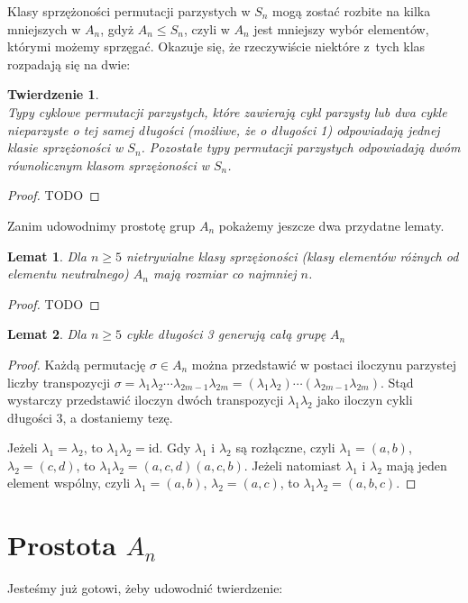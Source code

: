 \documentclass[licencjacka]{pracamgr}
\newtheorem{thh}{Twierdzenie}[section]
\newtheorem{lemma}{Lemat}[section]
\begin{document}
Klasy sprzężoności permutacji parzystych w $S_n$ mogą zostać rozbite na kilka mniejszych w $A_n$, 
gdyż $A_n \le S_n$, czyli w $A_n$ jest mniejszy wybór elementów, którymi możemy sprzęgać.
Okazuje się, że rzeczywiście niektóre z~tych klas rozpadają się na dwie:

\begin{thh}\label{thm_o_klasach_A_n} $ $ \\
	Typy cyklowe permutacji parzystych, które zawierają cykl parzysty lub dwa cykle nieparzyste o tej samej długości (możliwe, że o długości 1)
	odpowiadają jednej klasie sprzężoności w $S_n$.
	Pozostałe typy permutacji parzystych odpowiadają dwóm równolicznym klasom sprzężoności w $S_n$.
\end{thh}
\begin{proof}TODO
\end{proof}

Zanim udowodnimy prostotę grup $A_n$ pokażemy jeszcze dwa przydatne lematy.

\begin{lemma}\label{lemma_big_con}
	Dla $n \ge 5$ nietrywialne klasy sprzężoności (klasy elementów różnych od elementu neutralnego) $A_n$ mają rozmiar co najmniej $n$.
\end{lemma}
\begin{proof}TODO
\end{proof}

\begin{lemma}\label{lemma_3cycles}
	Dla $n \ge 5$ cykle długości 3 generują całą grupę $A_n$
\end{lemma}
\begin{proof}
	Każdą permutację  $\sigma \in A_n$ można przedstawić w postaci iloczynu parzystej liczby transpozycji
	$\sigma = \lambda_1 \lambda_2 \cdots \lambda_{2m-1} \lambda_{2m} = (\lambda_1 \lambda_2) \cdots (\lambda_{2m-1} \lambda_{2m})$.
	Stąd wystarczy przedstawić iloczyn dwóch transpozycji $\lambda_1 \lambda_2$ jako iloczyn cykli długości 3, a dostaniemy tezę.

	Jeżeli $\lambda_1 = \lambda_2$, to $\lambda_1 \lambda_2 = \mathrm{id}$.
	Gdy $\lambda_1$ i $\lambda_2$ są rozłączne, czyli $\lambda_1 = (a, b)$, $\lambda_2 = (c, d)$, to $\lambda_1 \lambda_2 = (a, c, d)(a, c, b)$.
	Jeżeli natomiast $\lambda_1$ i $\lambda_2$ mają jeden element wspólny, 
	czyli $\lambda_1 = (a, b)$, $\lambda_2 = (a, c)$, to $\lambda_1 \lambda_2 = (a, b, c)$.
\end{proof}


\section{Prostota $A_n$}
Jesteśmy już gotowi, żeby udowodnić twierdzenie:
\end{document}
